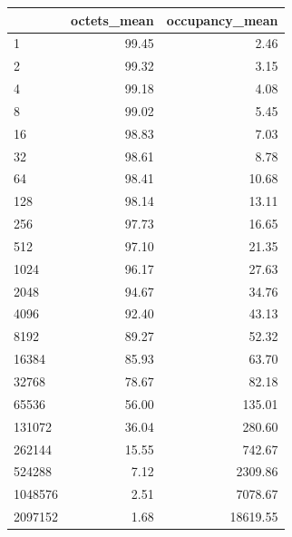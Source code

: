 \begin{tabular}{lrr}
\toprule
 & octets_mean & occupancy_mean \\
\midrule
1 & 99.45 & 2.46 \\
2 & 99.32 & 3.15 \\
4 & 99.18 & 4.08 \\
8 & 99.02 & 5.45 \\
16 & 98.83 & 7.03 \\
32 & 98.61 & 8.78 \\
64 & 98.41 & 10.68 \\
128 & 98.14 & 13.11 \\
256 & 97.73 & 16.65 \\
512 & 97.10 & 21.35 \\
1024 & 96.17 & 27.63 \\
2048 & 94.67 & 34.76 \\
4096 & 92.40 & 43.13 \\
8192 & 89.27 & 52.32 \\
16384 & 85.93 & 63.70 \\
32768 & 78.67 & 82.18 \\
65536 & 56.00 & 135.01 \\
131072 & 36.04 & 280.60 \\
262144 & 15.55 & 742.67 \\
524288 & 7.12 & 2309.86 \\
1048576 & 2.51 & 7078.67 \\
2097152 & 1.68 & 18619.55 \\
\bottomrule
\end{tabular}
